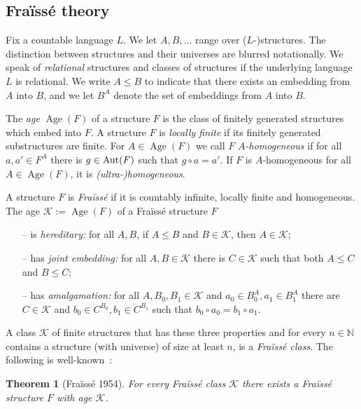 \documentclass[12pt]{amsart}
\theoremstyle{plain}
\newtheorem{theorem}{Theorem}[section]
\theoremstyle{definition}
\begin{document}
 
\subsection{Fra\"iss\'e theory}\label{sec:fraisse}
Fix a countable language $L$. We let $A,B,\ldots$ range over ($L$-)struc\-tures. The distinction between 
structures and their universes are blurred notationally. We speak of {\em relational} structures and classes of structures if the underlying language $L$ is relational. We write $A\le B$ to indicate that there exists an embedding from $A$ into $B$, and we let $B^A$ denote the set of embeddings from $A$ into $B$. 

The {\em age} $\operatorname{Age}(F)$ of  a structure $F$ is the class of finitely generated structures which embed into $F$. A structure $F$ is {\em locally finite} if its finitely generated substructures are finite. 
For $A\in\operatorname{Age}(F)$ we call $F$  {\em $A$-homogeneous} if for all $a,a'\in F^A$ there is $g\in\textup{Aut}(F)$ such that $g\circ a=a'$. If $F$ is $A$-homogeneous for all $A\in\operatorname{Age}(F)$, it is {\em (ultra-)homogeneous}. 

A structure $F$ is {\em Fra\"iss\'e} if it is countably infinite, locally finite and homogeneous. The age ${\mathcal K}:=\operatorname{Age}(F)$ of a Fra\"iss\'e structure $F$ 
\begin{itemize}\itemsep=0pt
\item[--] is {\em hereditary:} for all $A,B$, if $A\le B$ and $B\in{\mathcal K}$, then $A\in{\mathcal K}$; 
\item[--] has {\em joint embedding:} for all $A,B\in{\mathcal K}$ there is $C\in{\mathcal K}$ such that both $A\le C$ and $B\le C$; 
\item[--] has {\em amalgamation:} for all $ A, B_0, B_1\in{\mathcal K}$ and $a_0\in B_0^A, a_1\in  B_1^A$ there are $ C\in{\mathcal K}$ and $b_0\in C^{B_0},b_1\in  C^{ B_1}$ such that $b_0\circ a_0=b_1\circ a_1$.
\end{itemize}
A class ${\mathcal K}$ of finite structures that has these three properties and for every $n\in{\mathbb N}$ contains a structure (with universe) of size at least $n$, is a {\em Fra\"iss\'e class}. The following 
is well-known~\cite[T4.4.4]{zieglerbuch}:

\begin{theorem}[Fra\"iss\'e 1954] \label{thm:fraisse}
For every Fra\"iss\'e class ${\mathcal K}$ there exists a Fra\"iss\'e structure $F$ with age ${\mathcal K}$. 
\end{theorem}
\end{document}
